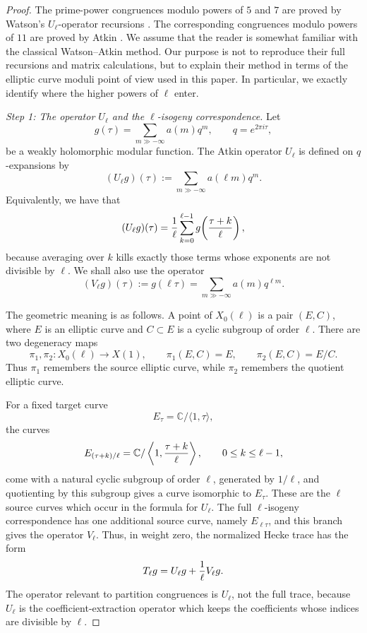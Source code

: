 \documentclass[12pt]{amsart}
\theoremstyle{definition}
\theoremstyle{remark}
\begin{document}
\begin{proof}
The prime-power congruences modulo powers of \(5\) and \(7\) are proved
by Watson's \(U_\ell\)-operator recursions \cite{Watson1938}. The
corresponding congruences modulo powers of \(11\) are proved by Atkin
\cite{Atkin}.  We assume that the reader is somewhat
familiar with the classical Watson--Atkin method.  Our purpose is not to
reproduce their full recursions and matrix calculations, but to explain
their method in terms of the elliptic curve moduli point of view used
in this paper. In particular, we exactly identify where the higher powers of
\(\ell\) enter.

\smallskip
\noindent
\emph{Step 1: The operator \(U_\ell\) and the \(\ell\)-isogeny
correspondence.}
Let
\[
        g(\tau)=\sum_{m\gg-\infty}a(m)q^m,\qquad q=e^{2\pi i\tau},
\]
be a weakly holomorphic modular function.  The Atkin operator \(U_\ell\)
is defined on \(q\)-expansions by
\[
        (U_\ell g)(\tau):=\sum_{m\gg-\infty}a(\ell m)q^m .
\]
Equivalently, we have that
\[
        (U_\ell g)(\tau)
        =
        {1\over \ell}\sum_{k=0}^{\ell-1}
        g\!\left({\tau+k\over \ell}\right),
\]
because averaging over \(k\) kills exactly those terms whose exponents
are not divisible by \(\ell\).  We shall also use the operator
\[
        (V_\ell g)(\tau):=g(\ell\tau)
        =
        \sum_{m\gg-\infty}a(m)q^{\ell m}.
\]

The geometric meaning is as follows.  A point of \(X_0(\ell)\) is a pair
\((E,C)\), where \(E\) is an elliptic curve and \(C\subset E\) is a
cyclic subgroup of order \(\ell\).  There are two degeneracy maps
\[
        \pi_1,\pi_2:X_0(\ell)\longrightarrow X(1),
        \qquad
        \pi_1(E,C)=E,\qquad
        \pi_2(E,C)=E/C.
\]
Thus \(\pi_1\) remembers the source elliptic curve, while \(\pi_2\)
remembers the quotient elliptic curve.

For a fixed target curve
\[
        E_\tau=\mathbb C/\langle 1,\tau\rangle,
\]
the curves
\[
        E_{(\tau+k)/\ell}
        =
        \mathbb C/\left\langle 1,{ \tau+k\over \ell}\right\rangle,
        \qquad 0\leq k\leq \ell-1,
\]
come with a natural cyclic subgroup of order \(\ell\), generated by
\(1/\ell\), and quotienting by this subgroup gives a curve isomorphic to
\(E_\tau\).  These are the \(\ell\) source curves which occur in the
formula for \(U_\ell\).  The full \(\ell\)-isogeny correspondence has
one additional source curve, namely \(E_{\ell\tau}\), and this branch
gives the operator \(V_\ell\).  Thus, in weight zero, the normalized
Hecke trace has the form
\[
        T_\ell g=U_\ell g+{1\over \ell}V_\ell g.
\]
The operator relevant to partition congruences is \(U_\ell\), not the
full trace, because \(U_\ell\) is the coefficient-extraction operator
which keeps the coefficients whose indices are divisible by \(\ell\).


\end{proof}
\end{document}
